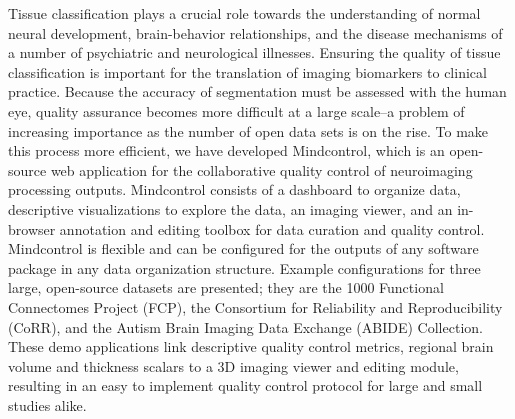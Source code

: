 Tissue classification plays a crucial role towards the understanding of normal neural development, brain-behavior relationships, and the disease mechanisms of a number of psychiatric and neurological illnesses. Ensuring the quality of tissue classification is important for the translation of imaging biomarkers to clinical practice. Because the accuracy of segmentation must be assessed with the human eye, quality assurance becomes more difficult at a large scale--a problem of increasing importance as the number of open data sets is on the rise. To make this process more efficient, we have developed Mindcontrol, which is an open-source web application for the collaborative quality control of neuroimaging processing outputs. Mindcontrol consists of a dashboard to organize data, descriptive visualizations to explore the data, an imaging viewer, and an in-browser annotation and editing toolbox for data curation and quality control. Mindcontrol is flexible and can be configured for the outputs of any software package in any data organization structure. Example configurations for three large, open-source datasets are presented; they are the 1000 Functional Connectomes Project (FCP), the Consortium for Reliability and Reproducibility (CoRR), and the Autism Brain Imaging Data Exchange (ABIDE) Collection. These demo applications link descriptive quality control metrics, regional brain volume and thickness scalars to a 3D imaging viewer and editing module, resulting in an easy to implement quality control protocol for large and small studies alike.